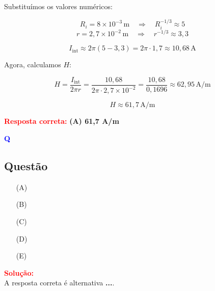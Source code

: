 \begin{flushleft}
Substituímos os valores numéricos:

\[
R_i = 8 \times 10^{-3}\,\text{m} \quad \Rightarrow \quad R_i^{-1/3} \approx 5
\]
\[
r = 2{,}7 \times 10^{-2}\,\text{m} \quad \Rightarrow \quad r^{-1/3} \approx 3{,}3
\]

\[
I_{\text{int}} \approx 2\pi (5 - 3{,}3) = 2\pi \cdot 1{,}7 \approx 10{,}68\, \text{A}
\]

Agora, calculamos \( H \):

\[
H = \frac{I_{\text{int}}}{2\pi r} = \frac{10{,}68}{2\pi \cdot 2{,}7 \times 10^{-2}} = \frac{10{,}68}{0{,}1696} \approx 62{,}95\, \text{A/m}
\]

\[
\boxed{H \approx 61{,}7\, \text{A/m}}
\]

\vspace{0.4cm}
\textcolor{red}{\textbf{Resposta correta:}} \colorbox{green!30}{\textbf{(A) 61,7 A/m}}
\end{flushleft}

\begin{flushleft}
\textbf{\textcolor{blue}{\Large Q}}\\
\noindent

\subsection{Quest\~ao }

\begin{itemize}
\item[(A)] 
\item[(B)] 
\item[(C)] 
\item[(D)] 
\item[(E)] 
\end{itemize}

\vspace{0.5cm}

\textcolor{red}{\textbf{Solução:}}\\

A resposta correta é alternativa \colorbox{green!50}{\textbf{...}}.
\end{flushleft}


